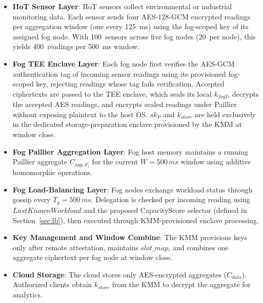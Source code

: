 \documentclass[conference]{IEEEtran}
\begin{document}
    \begin{itemize}
        \item \textbf{IIoT Sensor Layer}: IIoT sensors collect environmental or industrial monitoring data. Each sensor sends four AES-128-GCM encrypted readings per aggregation window (one every 125~ms) using the fog-scoped key of its assigned fog node. With 100~sensors across five fog nodes (20~per node), this yields 400~readings per 500~ms window.
        \item \textbf{Fog TEE Enclave Layer}: Each fog node first verifies the AES-GCM authentication tag of incoming sensor readings using its provisioned fog-scoped key, rejecting readings whose tag fails verification. Accepted ciphertexts are passed to the TEE enclave, which seals its local $k_{fogI}$, decrypts the accepted AES readings, and encrypts scaled readings under Paillier without exposing plaintext to the host OS. $sk_P$ and $k_{store}$ are held exclusively in the dedicated storage-preparation enclave provisioned by the KMM at window close.
        \item \textbf{Fog Paillier Aggregation Layer}: Fog host memory maintains a running Paillier aggregate $C_{agg,F_i}$ for the current $W=500\,ms$ window using additive homomorphic operations.
        \item \textbf{Fog Load-Balancing Layer}: Fog nodes exchange workload status through gossip every $T_g=500\,ms$. Delegation is checked per incoming reading using $LastKnownWorkload$ and the proposed CapacityScore selector (defined in Section~\ref{sec:lb}), then executed through KMM-provisioned enclave processing.
        \item \textbf{Key Management and Window Combine}: The KMM provisions keys only after remote attestation, maintains $slot\_map$, and combines one aggregate ciphertext per fog node at window close.
        \item \textbf{Cloud Storage}: The cloud stores only AES-encrypted aggregates ($C_{data}$). Authorized clients obtain $k_{store}$ from the KMM to decrypt the aggregate for analytics.
    \end{itemize}
\end{document}
